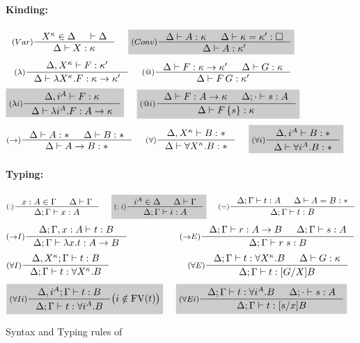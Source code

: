 \begin{figure}
\begin{framed}
\paragraph{Kinding:} 
\[ \inference[($Var$)]{X^\kappa\in\Delta & |- \Delta}
                       {\Delta |- X : \kappa}
 ~~~~ \newFi{
   \inference[($Conv$)]{ \Delta |- A : \kappa
                       & \Delta |- \kappa = \kappa' : \square }
                       {\Delta |- A : \kappa'} }
\]
\[
   \inference[($\lambda$)]{\Delta,X^\kappa |- F : \kappa'}
                          {\Delta |- \lambda X^\kappa.F : \kappa->\kappa'}
 ~~~~
   \inference[($@$)]{ \Delta |- F : \kappa -> \kappa'
                    & \Delta |- G : \kappa }
                    {\Delta |- F\,G : \kappa'}
\]
\[ \newFi{
   \inference[($\lambda i$)]{\Delta,i^A |- F : \kappa}
                            {\Delta |- \lambda i^A.F : A->\kappa} }
 ~~~~ \newFi{
   \inference[($@i$)]{ \Delta |- F : A -> \kappa
                     & \Delta;\cdot |- s : A }
                     {\Delta |- F\,\{s\} : \kappa} }
\]
\[ \inference[($->$)]{\Delta |- A : * & \Delta |- B : *}
                     {\Delta |- A -> B : * }
 ~~~~
   \inference[($\forall$)]{\Delta, X^\kappa |- B : *}
                          {\Delta |- \forall X^\kappa . B : *}
 ~~~~ \newFi{
   \inference[($\forall i$)]{\Delta, i^A |- B : *}
                            {\Delta |- \forall i^A . B : *} }
\]

\paragraph{Typing:} 
\[ \inference[($:$)]{x:A \in \Gamma & \Delta |- \Gamma} 
                    {\Delta;\Gamma |- x:A}
 ~~~~ \newFi{
   \inference[($:i$)]{i^A \in \Delta & \Delta |- \Gamma} 
                     {\Delta;\Gamma |- i:A} }
 ~~~~
   \inference[($=$)]{\Delta;\Gamma |- t : A & \Delta |- A = B : *}
                    {\Delta;\Gamma |- t : B}
\]
\[
   \inference[($->$$I$)]{\Delta;\Gamma,x:A |- t : B}
                        {\Delta;\Gamma |- \lambda x.t : A -> B}
 ~~~~ ~~~~ ~~~~ ~~~~
   \inference[($->$$E$)]{\Delta;\Gamma |- r : A -> B & \Delta;\Gamma |- s : A}
                        {\Delta;\Gamma |- r\;s : B}
\]
\[ \inference[($\forall I$)]{\Delta, X^\kappa;\Gamma |- t : B}
                            {\Delta;\Gamma |- t : \forall X^\kappa.B}
 ~~~~ ~~~~ ~~~~ ~~~~ ~~~~ ~~~~
   \inference[($\forall E$)]{ \Delta;\Gamma |- t : \forall X^\kappa.B
                            & \Delta |- G:\kappa }
                            {\Delta;\Gamma |- t : [G/X]B}
\]
\[ \newFi{
   \inference[($\forall I i$)]{\Delta, i^A;\Gamma |- t : B}
                              {\Delta;\Gamma |- t : \forall i^A.B}
     \big( i\notin\FV(t) \big) }
 ~~~~ \newFi{
   \inference[($\forall E i$)]{ \Delta;\Gamma |- t : \forall i^A.B
                              & \Delta;\cdot |- s:A}
                              {\Delta;\Gamma |- t : [s/x]B} }
\]
\end{framed}
\caption{Syntax and Typing rules of \Fi}
\label{fig:Fi}
\end{figure}

